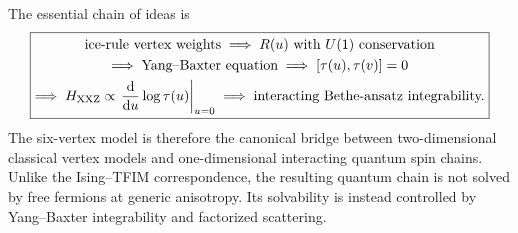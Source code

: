 The essential chain of ideas is
\begin{equation}
\label{eq:six-vertex-summary-chain}
\boxed{
\begin{gathered}
    \text{ice-rule vertex weights}
    \;\Longrightarrow\;
    R(u)\text{ with }U(1)\text{ conservation}
    \\
    \Longrightarrow\;
    \text{Yang--Baxter equation}
    \;\Longrightarrow\;
    [\tau(u),\tau(v)]=0
    \\
    \Longrightarrow\;
    H_{\rm XXZ}\propto
    \left.\frac{\mathrm{d}}{\mathrm{d} u}\log\tau(u)\right|_{u=0}
    \;\Longrightarrow\;
    \text{interacting Bethe-ansatz integrability.}
\end{gathered}}
\end{equation}
The six-vertex model is therefore the canonical bridge between two-dimensional
classical vertex models and one-dimensional interacting quantum spin chains.
Unlike the Ising--TFIM correspondence, the resulting quantum chain is not solved
by free fermions at generic anisotropy.  Its solvability is instead controlled by
Yang--Baxter integrability and factorized scattering.
